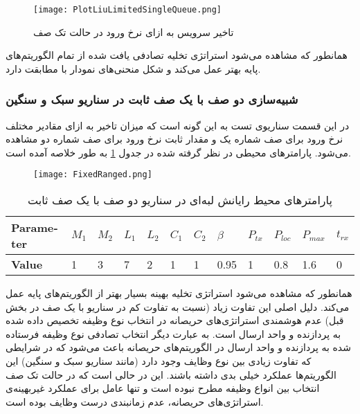 \begin{figure}[H]
	\centering
	\texttt{[image: PlotLiuLimitedSingleQueue.png]}
	\caption{تاخیر سرویس به ازای نرخ ورود در حالت تک صف}
	\label{plot:singleQueue}
\end{figure}
همانطور که مشاهده می‌شود استراتژی تخلیه تصادفی یافت شده از تمام الگوریتم‌های پایه بهتر عمل می‌کند و شکل منحنی‌های نمودار با \cite{Liu} مطابقت دارد.
\newpage
\subsubsection{شبیه‌سازی دو صف با یک صف ثابت در سناریو سبک و سنگین}
در این قسمت سناریوی تست به این گونه است که میزان تاخیر به ازای مقادیر مختلف نرخ ورود برای صف شماره یک و مقدار ثابت نرخ ورود برای صف شماره دو مشاهده می‌شود. پارامترهای محیطی در نظر گرفته شده در جدول \ref{table:fixedranged} به طور خلاصه آمده است.
\begin{figure}[H]
	\texttt{[image: FixedRanged.png]}
\end{figure}
\begin{table}[H]
	\centering
	\begin{latin}
		\begin{tabular}{@{}llllllllllll@{}}
			\toprule
			\textbf{Parameter} & $M_1$ & $M_2$ & $L_1$ & $L_2$ & $C_1$ & $C_2$ & $\beta$ & $P_{tx}$ & $P_{loc}$ & $P_{max}$ & $t_{rx}$ \\ \midrule
			\textbf{Value}     & 1     & 3     & 7     & 2     & 1     & 1     & 0.95    & 1        & 0.8       & 1.6       & 0        \\ \bottomrule
		\end{tabular}
	\end{latin}
	\caption{پارامترهای محیط رایانش لبه‌ای در سناریو دو صف با یک صف ثابت}
	\label{table:fixedranged}
\end{table}
همانطور که مشاهده می‌شود استراتژی تخلیه بهینه بسیار بهتر از الگوریتم‌های پایه عمل می‌کند. دلیل اصلی این تفاوت زیاد (نسبت به تفاوت کم در سناریو با یک صف در بخش قبل) عدم هوشمندی استراتژی‌های حریصانه در انتخاب نوع وظیفه تخصیص داده شده به پردازنده و واحد ارسال است. به عبارت دیگر انتخاب تصادفی نوع وظیفه فرستاده شده به پردازنده و واحد ارسال در الگوریتم‌های حریصانه باعث می‌شود که در شرایطی که تفاوت زیادی بین نوع وظایف وجود دارد (مانند سناریو سبک و سنگین) این الگوریتم‌ها عملکرد خیلی بدی داشته باشند. این در حالی است که در حالت تک صف انتخاب بین انواع وظیفه مطرح نبوده است و تنها عامل برای عملکرد غیربهینه‌ی استراتژی‌های حریصانه، عدم زمانبندی درست وظایف بوده است.
\newpage
